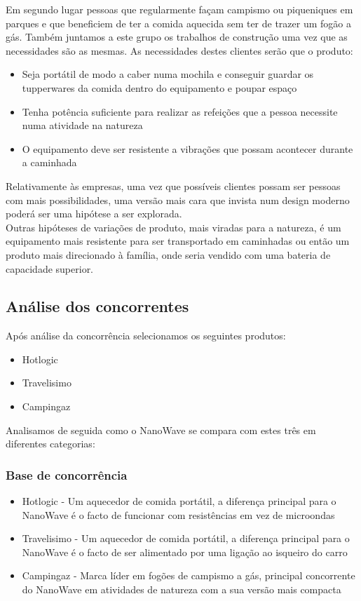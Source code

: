 \documentclass[a4paper]{article}
\begin{document}
Em segundo lugar pessoas que regularmente façam campismo ou piqueniques em parques e que beneficiem de ter a comida aquecida sem ter de trazer um fogão a gás. Também juntamos a este grupo os trabalhos de construção uma vez que as necessidades são as mesmas.
As necessidades destes clientes serão que o produto:
\begin{itemize}
    \item Seja portátil de modo a caber numa mochila e conseguir guardar os tupperwares da comida dentro do equipamento e poupar espaço
    \item Tenha potência suficiente para realizar as refeições que a pessoa necessite numa atividade na natureza 
    \item O equipamento deve ser resistente a vibrações que possam acontecer durante a caminhada
\end{itemize}


Relativamente às empresas, uma vez que possíveis clientes possam ser pessoas com mais possibilidades, uma versão mais cara que invista num design moderno poderá ser uma hipótese a ser explorada.\\
Outras hipóteses de variações de produto, mais viradas para a natureza, é um equipamento mais resistente para ser transportado em caminhadas ou então um produto mais direcionado à família, onde seria vendido com uma bateria de capacidade superior.

\subsection{Análise dos concorrentes}
Após análise da concorrência selecionamos os seguintes produtos:
\begin{itemize}
    \item Hotlogic
    \item Travelisimo
    \item Campingaz
\end{itemize}

Analisamos de seguida como o NanoWave se compara com estes três em diferentes categorias:

\subsubsection{Base de concorrência}
\begin{itemize}
    \item Hotlogic - Um aquecedor de comida portátil, a diferença principal para o NanoWave é o facto de funcionar com resistências em vez de microondas
    \item Travelisimo - Um aquecedor de comida portátil, a diferença principal para o NanoWave é o facto de ser alimentado por uma ligação ao isqueiro do carro
    \item Campingaz - Marca líder em fogões de campismo a gás, principal concorrente do NanoWave em atividades de natureza com a sua versão mais compacta
\end{itemize}
\end{document}
